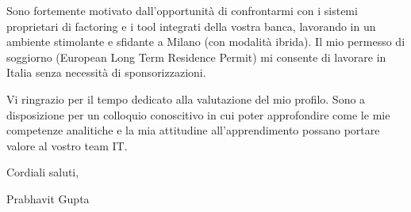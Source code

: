 \documentclass[a4paper,11pt]{article}
\begin{document}
Sono fortemente motivato dall'opportunità di confrontarmi con i sistemi proprietari di factoring e i tool integrati della vostra banca, lavorando in un ambiente stimolante e sfidante a Milano (con modalità ibrida). Il mio permesso di soggiorno (European Long Term Residence Permit) mi consente di lavorare in Italia senza necessità di sponsorizzazioni.

Vi ringrazio per il tempo dedicato alla valutazione del mio profilo. Sono a disposizione per un colloquio conoscitivo in cui poter approfondire come le mie competenze analitiche e la mia attitudine all'apprendimento possano portare valore al vostro team IT.

Cordiali saluti,

Prabhavit Gupta
\end{document}
